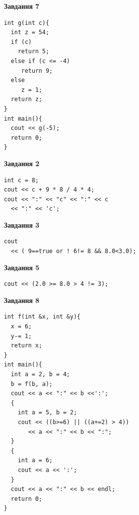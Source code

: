 \documentclass[12pt, ukrainian]{article}
\begin{document}
{\begin {large}
\begin{minipage}[t]{7.0cm}
\begin{center}
\textbf{Завдання 7}
\end{center}
\vspace{-8mm}

\begin{verbatim}
int g(int c){
  int z = 54;
  if (c)
    return 5;
  else if (c <= -4)
     return 9;
  else
     z = 1;
  return z;
}
int main(){
  cout << g(-5);
  return 0;
}
\end{verbatim}

\end{minipage}
\vline \hspace{1mm}
\begin{minipage}[t]{11.0cm}

\begin{center}
\textbf{Завдання 2}
\end{center}
\vspace{-8mm}

\begin{verbatim}
int c = 8;
cout << c + 9 * 8 / 4 * 4;
cout << ":" << "c" << ":" << c 
  << ":" << 'c';
\end{verbatim}



\begin{center}
\textbf{Завдання 3}
\end{center}
\vspace{-8mm}

\begin{verbatim}
cout 
  << ( 9==true or ! 6!= 8 && 8.0<3.0);
\end{verbatim}



\begin{center}
\textbf{Завдання 5}
\end{center}
\vspace{-8mm}

\begin{verbatim}
cout << (2.0 >= 8.0 > 4 != 3);
\end{verbatim}



\begin{center}
\textbf{Завдання 8}
\end{center}
\vspace{-8mm}

\begin{verbatim}
int f(int &x, int &y){
  x = 6;
  y-= 1;
  return x;
}
int main(){
  int a = 2, b = 4;
  b = f(b, a);
  cout << a << ":" << b <<':';
  {
    int a = 5, b = 2;
    cout << ((b>=6) || ((a+=2) > 4))
       << a << ":" << b << ":";
  }
  {
    int a = 6;
    cout << a << ':';
  }
  cout << a << ":" << b << endl;
  return 0;
}
\end{verbatim}


\end{minipage}
\end{large}}
\end{document}
